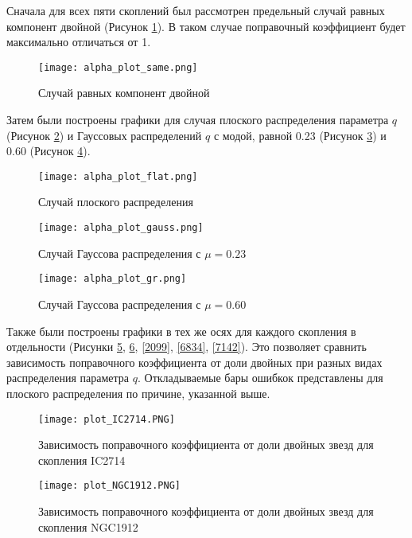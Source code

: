 \documentclass[a4paper,12pt]{article}
\begin{document}
Сначала для всех пяти скоплений был рассмотрен предельный случай равных компонент двойной (Рисунок \ref{Plot_same}). В таком случае поправочный коэффициент будет максимально отличаться от 1.

\vspace{1cm}
\begin{figure}[h!]\centering
\texttt{[image: alpha\_plot\_same.png]}
\caption{Случай равных компонент двойной}
\label{Plot_same}
\end{figure}

Затем были построены графики для случая плоского распределения параметра $q$ (Рисунок \ref{Plot_flat}) и Гауссовых распределений $q$ с модой, равной 0.23 (Рисунок \ref{Plot_G23}) и 0.60 (Рисунок \ref{Plot_G60}).

\begin{figure}[h!]\centering
\texttt{[image: alpha\_plot\_flat.png]}
\caption{Случай плоского распределения}
\label{Plot_flat}
\end{figure}

\vspace{2cm}

\begin{figure}[h!]\centering
\texttt{[image: alpha\_plot\_gauss.png]}
\caption{Случай Гауссова распределения с $\mu =0.23$}
\label{Plot_G23}
\end{figure}
\vspace{3cm}

\begin{figure}[h!]\centering
\texttt{[image: alpha\_plot\_gr.png]}
\caption{Случай Гауссова распределения с $\mu =0.60$}
\label{Plot_G60}
\end{figure}

Также были построены графики в тех же осях для каждого скопления в отдельности (Рисунки \ref{2714}, \ref{1912}, \ref{2099}, \ref{6834}, \ref{7142}). Это позволяет сравнить зависимость поправочного коэффициента от доли двойных при разных видах распределения параметра $q$. Откладываемые бары ошибкок представлены для плоского распределения по причине, указанной выше.

\begin{figure}[h!]\centering
\texttt{[image: plot\_IC2714.PNG]}
\caption{Зависимость поправочного коэффициента от доли двойных звезд для скопления IC2714}
\label{2714}
\end{figure}

\begin{figure}[h!]\centering
\texttt{[image: plot\_NGC1912.PNG]}
\caption{Зависимость поправочного коэффициента от доли двойных звезд для скопления NGC1912}
\label{1912}
\end{figure}
\vspace{3cm}
\end{document}
